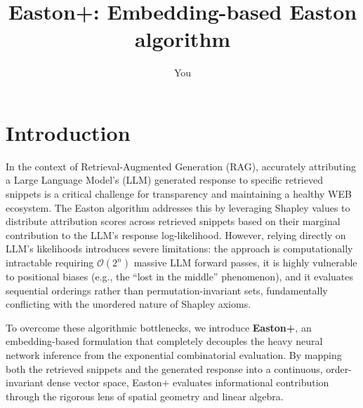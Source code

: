 \documentclass{article}
\title{Easton+: Embedding-based Easton algorithm}
\author{You}
\begin{document}
\maketitle

\section{Introduction}

In the context of Retrieval-Augmented Generation (RAG), accurately attributing a Large Language Model's (LLM) generated response to specific retrieved snippets is a critical challenge for transparency and maintaining a healthy WEB ecosystem. The Easton algorithm addresses this by leveraging Shapley values to distribute attribution scores across retrieved snippets based on their marginal contribution to the LLM's response log-likelihood. However, relying directly on LLM's likelihoods introduces severe limitations: the approach is computationally intractable requiring $\mathcal{O}(2^n)$ massive LLM forward passes, it is highly vulnerable to positional biases (e.g., the ``lost in the middle'' phenomenon), and it evaluates sequential orderings rather than permutation-invariant sets, fundamentally conflicting with the unordered nature of Shapley axioms.

To overcome these algorithmic bottlenecks, we introduce \textbf{Easton+}, an embedding-based formulation that completely decouples the heavy neural network inference from the exponential combinatorial evaluation. By mapping both the retrieved snippets and the generated response into a continuous, order-invariant dense vector space, Easton+ evaluates informational contribution through the rigorous lens of spatial geometry and linear algebra.
\end{document}
